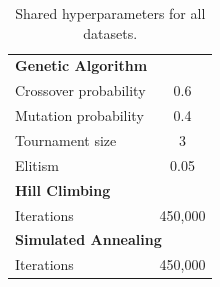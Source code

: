 \begin{table}[h]
\centering\footnotesize\sf

\begin{tabular}{l@{}c}
\multicolumn{2}{l}{\textbf{Genetic Algorithm}} \\
Crossover probability & 0.6 \\
Mutation probability & 0.4 \\
Tournament size & 3 \\
Elitism & 0.05 \\
\midrule
\multicolumn{2}{l}{\textbf{Hill Climbing}} \\
Iterations & 450,000 \\
\midrule
\multicolumn{2}{l}{\textbf{Simulated Annealing}} \\
Iterations & 450,000 \\
\end{tabular}

\caption[Shared hyperparameters]{Shared hyperparameters for all datasets.}
\label{tab:hyperparams_shared}
\end{table}

